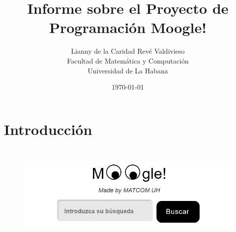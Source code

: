 \documentclass[12pt,a4paper]{report}
\title{\Huge Informe sobre el Proyecto de Programación Moogle!}
\author{Lianny de la Caridad Revé Valdivieso \\ Facultad de Matemática y Computación \\ Universidad de La Habana}
\date{\today}
\begin{document}
\maketitle

\chapter*{Introducción}

\begin{figure}[h]
    \centering
    \includegraphics[height=5cm]{MoogleSearcher}
\end{figure}

\vspace{1cm}
\end{document}
